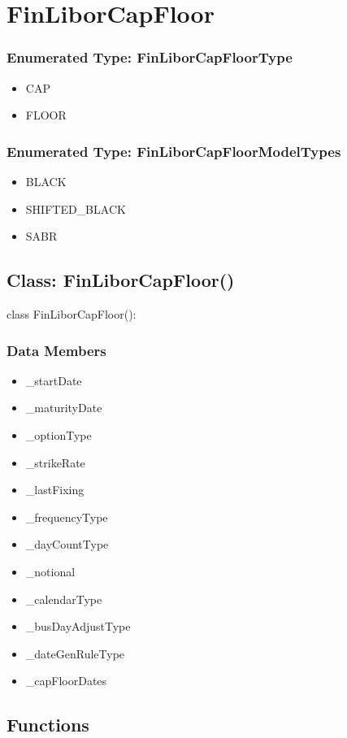\documentclass[twoside,11pt]{book}
\begin{document}
\section{FinLiborCapFloor}

\subsubsection{Enumerated Type: FinLiborCapFloorType}
\begin{itemize}
\item{CAP}
\item{FLOOR}
\end{itemize}

\subsubsection{Enumerated Type: FinLiborCapFloorModelTypes}
\begin{itemize}
\item{BLACK}
\item{SHIFTED\_BLACK}
\item{SABR}
\end{itemize}

\subsection*{Class: FinLiborCapFloor()}
class FinLiborCapFloor(): 

\subsubsection*{Data Members}
\begin{itemize}
\item{\_startDate}
\item{\_maturityDate}
\item{\_optionType}
\item{\_strikeRate}
\item{\_lastFixing}
\item{\_frequencyType}
\item{\_dayCountType}
\item{\_notional}
\item{\_calendarType}
\item{\_busDayAdjustType}
\item{\_dateGenRuleType}
\item{\_capFloorDates}
\end{itemize}

\subsection*{Functions}
\end{document}
